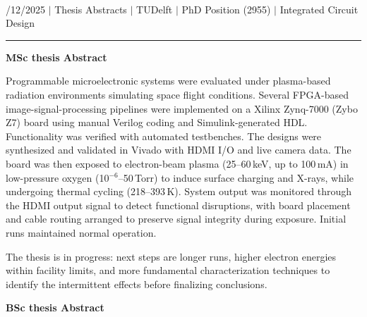 \documentclass[a4paper,12pt]{article}
\begin{document}
\begin{center}
  {\Huge \scshape {\fontsize{25}{30}\selectfont{Reza}} {\fontsize{25}{30}}} \\ 
  {\fontsize{12}{12}/12/2025} $|$
  {\fontsize{12}{12}\selectfont Thesis Abstracts} $|$
  {\fontsize{12}{12}\selectfont TUDelft} $|$
  {\fontsize{12}{12}\selectfont PhD Position (2955)} $|$
  {\fontsize{12}{12}\selectfont Integrated Circuit Design}
\end{center}

\vspace{-20pt}
\noindent\rule{\textwidth}{0.5pt}

\noindent\textbf{MSc thesis Abstract}
\vspace{5pt}

Programmable microelectronic systems were evaluated under plasma-based radiation environments simulating space flight conditions. Several FPGA-based image-signal-processing pipelines were implemented on a Xilinx Zynq-7000 (Zybo Z7) board using manual Verilog coding and Simulink-generated HDL. Functionality was verified with automated testbenches. The designs were synthesized and validated in Vivado with HDMI I/O and live camera data. The board was then exposed to electron-beam plasma (25--60\,keV, up to 100\,mA) in low-pressure oxygen (10$^{-6}$--50\,Torr) to induce surface charging and X-rays, while undergoing thermal cycling (218--393\,K). System output was monitored through the HDMI output signal to detect functional disruptions, with board placement and cable routing arranged to preserve signal integrity during exposure. Initial runs maintained normal operation. 

\vspace{5pt}

The thesis is in progress: next steps are longer runs, higher electron energies within facility limits, and more fundamental characterization techniques to identify the intermittent effects before finalizing conclusions.

\vspace{25pt}

\noindent\textbf{BSc thesis Abstract}
\vspace{5pt}
\end{document}
